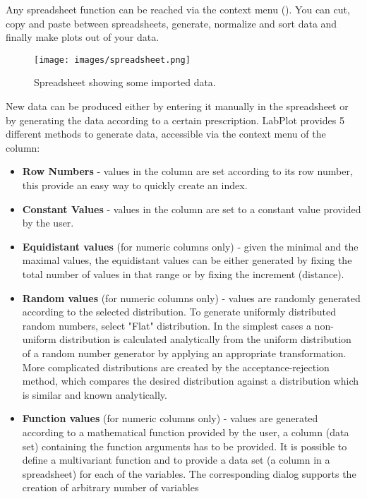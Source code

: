 Any spreadsheet function can be reached via the context menu (\rmb).
You can cut, copy and paste between spreadsheets, generate, normalize and sort data and finally make plots out of your data.
\begin{figure}
\texttt{[image: images/spreadsheet.png]}
\caption{Spreadsheet showing some imported data.}
\end{figure}

New data can be produced either by entering it manually in the spreadsheet or by generating the data according to a certain prescription.
LabPlot provides 5 different methods to generate data, accessible via the context menu of the column:
\begin{itemize}
\item \textbf{Row Numbers} - values in the column are set according to its row number, this provide an easy way to quickly create an index.
%
\item \textbf{Constant Values} - values in the column are set to a constant value provided by the user.
%
\item \textbf{Equidistant values} (for numeric columns only) - given the minimal and the maximal values, the equidistant values can be either generated
by fixing the total number of values in that range or by fixing the increment (distance).
%
\item \textbf{Random values} (for numeric columns only) - values are randomly generated according to the selected distribution.
To generate uniformly distributed random numbers, select "Flat" distribution.
In the simplest cases a non-uniform distribution is calculated analytically from the uniform distribution of a random number generator by applying
an appropriate transformation. More complicated distributions are created by the acceptance-rejection method, which compares the desired distribution
against a distribution which is similar and known analytically.
%
\item \textbf{Function values} (for numeric columns only) - values are generated according to a mathematical function provided by the user,
a column (data set) containing the function arguments has to be provided.
It is possible to define a multivariant function and to provide a data set (a column in a spreadsheet) for each of the variables.
The corresponding dialog supports the creation of arbitrary number of variables
\end{itemize}


